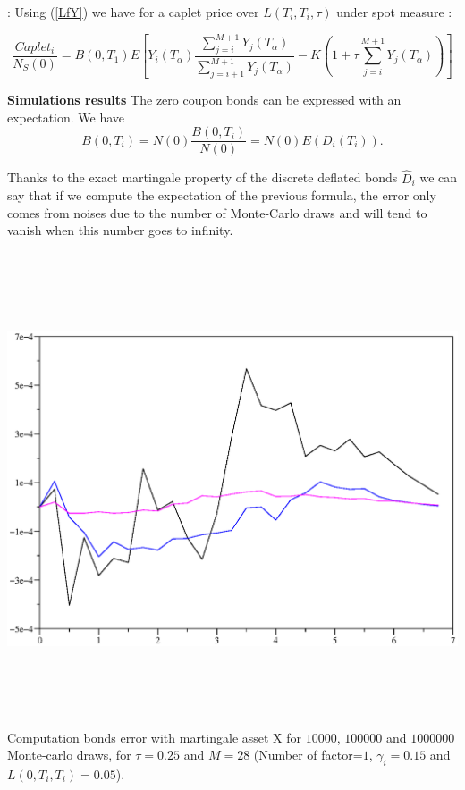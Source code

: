 \documentclass[10pt,a4paper,english,landscape]{slides}
\begin{document}
 :
Using (\ref{LfY}) we have for a caplet price over $L(T_i,T_i,\tau)$ under spot measure :

\begin{equation}
\frac{Caplet_i}{N_S(0)}=B(0,T_1)E\left[Y_i(T_\alpha)\frac{\sum_{j=i}^{M+1}Y_j(T_\alpha)}{\sum_{j=i+1}^{M+1}Y_j(T_\alpha)}-K\left(1+\tau \sum_{j=i}^{M+1}Y_j(T_\alpha)\right)\right]
\end{equation}

{\bf Simulations results}
The zero coupon bonds can be expressed with an expectation. We have $$B(0,T_i)=N(0)\frac{B(0,T_i)}{N(0)}=N(0)E(D_i(T_i)).$$ 

Thanks to the exact martingale property of the discrete deflated bonds $\hat{D}_i$ we can say that if we compute the expectation of the previous formula, the error only comes from noises due to the number of Monte-Carlo draws and will tend to vanish when this number goes to infinity.

\begin{center}
\includegraphics[height=14cm]{./figures/bondserror.eps}\\
{\small Computation bonds error with martingale asset X for $10 000$, $100 000$ and $1 000 000$ Monte-carlo draws, for $\tau=0.25$ and $M=28$ (Number of factor=$1$, $\gamma_i=0.15$ and $L(0,T_i,T_i)=0.05$)}.
\end{center}
\end{document}
